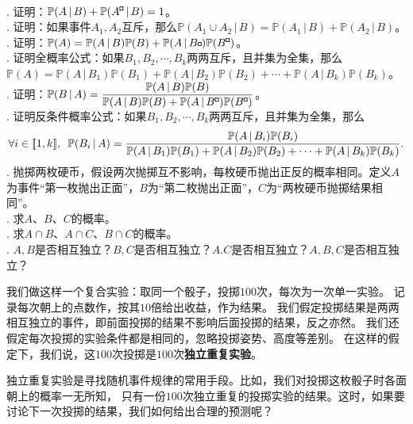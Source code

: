 \documentclass[12pt,UTF8,fontset=none]{ctexbook}
\begin{document}
\begin{xt}
    \mbox{} \\
    . 证明：$\mathbb{P}(A \, | \, B) + \mathbb{P}(A^{\bu} \, | \, B) = 1$。 \\
    . 证明：如果事件$A_1,A_2$互斥，那么$\mathbb{P}(A_1 \cup A_2\, | \, B) = \mathbb{P}(A_1 \, | \, B) + \mathbb{P}(A_2 \, | \, B)$。 \\
    . 证明：$\mathbb{P}(A) = \mathbb{P}(A \, | \, B) \mathbb{P}(B) + \mathbb{P}(A \, | \, B{\bu}) \mathbb{P}(B^{\bu})$。 \\
    . 证明全概率公式：如果$B_1, B_2, \cdots, B_k$两两互斥，且并集为全集，那么$\mathbb{P}(A) = \mathbb{P}(A \, | \, B_1) \mathbb{P}(B_1) + \mathbb{P}(A \, | \, B_2) \mathbb{P}(B_2) + \cdots + \mathbb{P}(A \, | \, B_k) \mathbb{P}(B_k)$。 \\
    . 证明：$\displaystyle\mathbb{P}(B \, | \, A) = \frac{\mathbb{P}(A \, | \, B) \mathbb{P}(B)}{\mathbb{P}(A \, | \, B) \mathbb{P}(B) + \mathbb{P}(A \, | \, B^{\bu}) \mathbb{P}(B^{\bu})}$。 \\
    . 证明反条件概率公式：如果$B_1, B_2, \cdots, B_k$两两互斥，且并集为全集，那么
    $$\forall i\in[\![1,k]\!], \,\,\, \mathbb{P}(B_i \, | \, A) = \frac{\mathbb{P}(A \, | \, B_i) \mathbb{P}(B_i)}{\mathbb{P}(A \, | \, B_1) \mathbb{P}(B_1) + \mathbb{P}(A \, | \, B_2) \mathbb{P}(B_2) + \cdots + \mathbb{P}(A \, | \, B_k) \mathbb{P}(B_k)}.$$ 
    . 抛掷两枚硬币，假设两次抛掷互不影响，每枚硬币抛出正反的概率相同。定义$A$为事件“第一枚抛出正面”，$B$为“第二枚抛出正面”，$C$为“两枚硬币抛掷结果相同”。 \\
    . 求$A$、$B$、$C$的概率。\\
    . 求$A\cap B$、$A\cap C$、$B \cap C$的概率。\\
    . $A,B$是否相互独立？$B,C$是否相互独立？$A.C$是否相互独立？$A,B,C$是否相互独立？
\end{xt}


我们做这样一个复合实验：取同一个骰子，投掷$100$次，每次为一次单一实验。
记录每次朝上的点数作，按其$10$倍给出收益，作为结果。
我们假定投掷结果是两两相互独立的事件，即前面投掷的结果不影响后面投掷的结果，反之亦然。
我们还假定每次投掷的实验条件都是相同的，忽略投掷姿势、高度等差别。
在这样的假定下，我们说，这$100$次投掷是$100$次\textbf{独立重复实验}。

独立重复实验是寻找随机事件规律的常用手段。比如，我们对投掷这枚骰子时各面朝上的概率一无所知，
只有一份$100$次独立重复的投掷实验的结果。这时，如果要讨论下一次投掷的结果，我们如何给出合理的预测呢？
\end{document}
